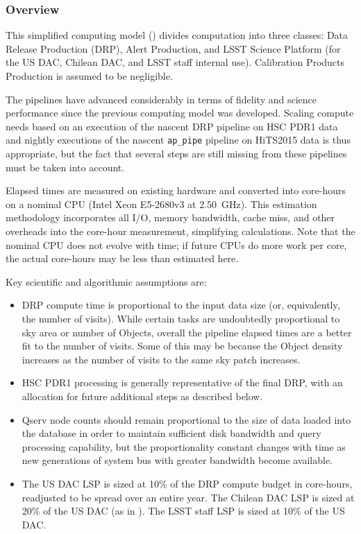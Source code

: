 

\subsubsection{Overview}
This simplified computing model () divides computation into three classes: Data Release Production (DRP), Alert Production, and LSST Science Platform (for the US DAC, Chilean DAC, and LSST staff internal use).
Calibration Products Production is assumed to be negligible.

The pipelines have advanced considerably in terms of fidelity and science performance since the previous computing model  was developed.
Scaling compute needs based on an execution of the nascent DRP pipeline on HSC PDR1 data and nightly executions of the nascent \texttt{ap\_pipe} pipeline on HiTS2015 data is thus appropriate, but the fact that several steps are still missing from these pipelines must be taken into account.

Elapsed times are measured on existing hardware and converted into core-hours on a nominal CPU (Intel Xeon E5-2680v3 at 2.50~GHz).
This estimation methodology incorporates all I/O, memory bandwidth, cache miss, and other overheads into the core-hour measurement, simplifying calculations.
Note that the nominal CPU does not evolve with time; if future CPUs do more work per core, the actual core-hours may be less than estimated here.

Key scientific and algorithmic assumptions are:
\begin{itemize}
\item DRP compute time is proportional to the input data size (or, equivalently, the number of visits).
While certain tasks are undoubtedly proportional to sky area or number of Objects, overall the pipeline elapsed times are a better fit to the number of visits.
Some of this may be because the Object density increases as the number of visits to the same sky patch increases.
\item HSC PDR1 processing is generally representative of the final DRP, with an allocation for future additional steps as described below.
\item Qserv node counts should remain proportional to the size of data loaded into the database in order to maintain sufficient disk bandwidth and query processing capability, but the proportionality constant changes with time as new generations of system bus with greater bandwidth become available.
\item The US DAC LSP is sized at 10\% of the DRP compute budget in core-hours, readjusted to be spread over an entire year.
The Chilean DAC LSP is sized at 20\% of the US DAC (as in ).
The LSST staff LSP is sized at 10\% of the US DAC.
\end{itemize}

